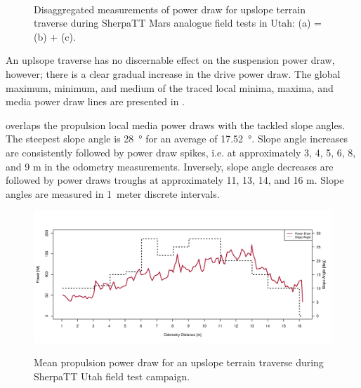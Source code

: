 \begin{figure}[h]
\begin{subfigure}[t]{\subfigureWidth}
		\label{fig:plot:sub:sherpatt-disaggregated-upslope-terrain-power-draw-suspension}
	\end{subfigure}\\[0.8ex]
    \caption[Disaggregated measurements of power draw for upslope terrain traverse]
            {Disaggregated measurements of power draw for upslope terrain traverse during SherpaTT Mars analogue field tests in Utah: (a) = (b) + (c).}
    \label{fig:plot:sherpatt-disaggregated-upslope-terrain-power-draw}
\vspace{-2ex}
\end{figure}


An uplsope traverse has no discernable effect on the suspension power draw, however; there is a clear gradual increase in the drive power draw. The global maximum, minimum, and medium of the traced local minima, maxima, and media power draw lines are presented in .



 overlaps the propulsion local media power draws with the tackled slope angles. The steepest slope angle is \SI{28}{\degree} for an average of \SI{17.52}{\degree}. Slope angle increases are consistently followed by power draw spikes, i.e. at approximately 3, 4, 5, 6, 8, and 9 \si{\meter} in the odometry measurements. Inversely, slope angle decreases are followed by power draws troughs at approximately 11, 13, 14, and 16 \si{\meter}. Slope angles are measured in \SI{1}{meter} discrete intervals.

\begin{figure}[h]
  \centering
  \hypersetup{linkcolor=captionTextColor}
  \includegraphics[width=0.8\linewidth]{sections/power-system-design/power-budget/plots/minima-locomotion-power-draws-on-upslope-terrain.png}\\
  \caption[Mean propulsion power draw for an upslope terrain traverse]
          {Mean propulsion power draw for an upslope terrain traverse during SherpaTT Utah field test campaign.}
  \label{fig:plot:sherpatt-upslope-terrain-power-draw}
\end{figure}


